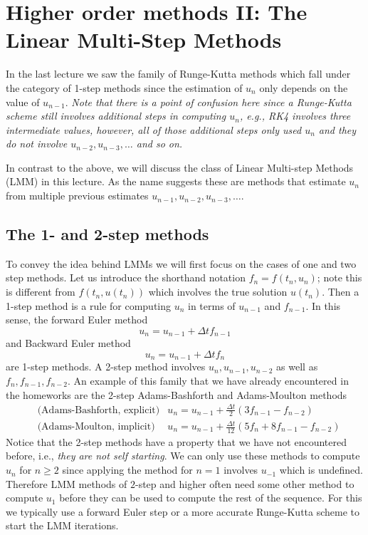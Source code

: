 \chapter{Higher order methods II: 
The Linear Multi-Step Methods}

In the last lecture we saw the family of Runge-Kutta 
methods which fall under the category of 
1-step methods since the estimation of $u_n$ only 
depends on the value of $u_{n-1}$. {\it Note that 
there is a point of confusion here since a 
Runge-Kutta scheme still involves additional steps 
in computing $u_n$, e.g., RK4 involves three 
intermediate values, however, all of those 
additional steps only used $u_n$ and they do not 
involve $u_{n-2}, u_{n-3}, \dots$ and so on. }

In contrast to the above, we will discuss the 
class of Linear Multi-step Methods (LMM) in this 
lecture. As the name suggests these are 
methods that estimate $u_n$ from multiple previous 
estimates $u_{n-1}, u_{n-2}, u_{n-3}, \dots$. 


\section{The 1- and 2-step methods}
To convey the idea behind LMMs we will first focus on the 
cases of one and two step methods. Let us introduce 
the shorthand notation $f_n = f(t_n, u_n)$; note this is 
different from $f(t_n, u(t_n))$ which involves the true solution 
$u(t_n)$. Then a 1-step method is a rule for computing $u_n$ 
in terms of $u_{n-1}$ and $f_{n-1}$. In this sense, the forward 
Euler method 
\begin{equation*}
    u_n = u_{n-1} + \Delta t f_{n-1}
\end{equation*}
and Backward Euler method
\begin{equation*}
    u_n = u_{n-1} + \Delta t f_{n}
\end{equation*}
are 1-step methods. A 2-step method involves $u_n, u_{n-1}, u_{n-2}$ 
as well as $f_n, f_{n-1}, f_{n-2}$. An example of this 
family that we have already encountered in the homeworks are
the 2-step Adams-Bashforth and Adams-Moulton methods 
\begin{equation*}
    \begin{aligned}
            & \text{(Adams-Bashforth, explicit)}  &u_{n} =  u_{n-1} + \frac{\Delta t}{2} \left( 3 f_{n-1} - f_{n-2} \right) \\ 
        & \text{(Adams-Moulton, implicit)}  &u_{n} = u_{n-1} + \frac{\Delta t}{12} \left( 
         5 f_{n} + 8 f_{n-1} - f_{n-2}   
        \right)  
    \end{aligned}
\end{equation*}
Notice that the 2-step methods have a property that we 
have not encountered before, i.e.,{\it  
they are not self starting}. We can only use these methods 
to compute $u_n$ for $n \ge 2$ since applying the method 
for $n=1$ involves $u_{-1}$ which is undefined. Therefore
LMM methods of $2$-step and higher often need some other 
method to compute $u_1$ before they can be used to 
compute the rest of the sequence. For this 
we typically use a forward Euler step or a more 
accurate Runge-Kutta scheme to start the LMM iterations.

